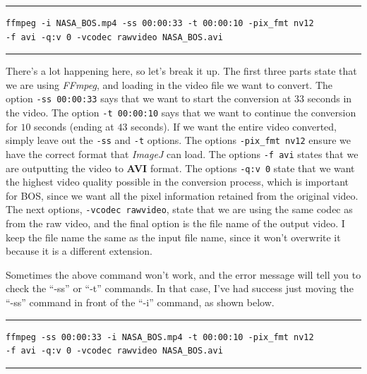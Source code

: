 \documentclass[letterpaper,12pt]{article}
\begin{document}
\par\noindent\rule{\textwidth}{0.4pt}

\vspace{1em}
\lstset{basicstyle=\large}
\begin{lstlisting}[style=CMD]
ffmpeg -i NASA_BOS.mp4 -ss 00:00:33 -t 00:00:10 -pix_fmt nv12 
-f avi -q:v 0 -vcodec rawvideo NASA_BOS.avi
\end{lstlisting}

\par\noindent\rule{\textwidth}{0.4pt}

There's a lot happening here, so let's break it up.  The first three parts state that we are using \textit{FFmpeg}, and loading in the video file we want to convert.  The option \texttt{-ss 00:00:33} says that we want to start the conversion at $33$ seconds in the video.  The option \texttt{-t 00:00:10} says that we want to continue the conversion for $10$ seconds (ending at $43$ seconds).  If we want the entire video converted, simply leave out the \texttt{-ss} and \texttt{-t} options.  The options \texttt{-pix\_fmt nv12} ensure we have the correct format that \textit{ImageJ} can load.  The options \texttt{-f avi} states that we are outputting the video to \textbf{AVI} format.  The options \texttt{-q:v 0} state that we want the highest video quality possible in the conversion process, which is important for BOS, since we want all the pixel information retained from the original video.  The next options, \texttt{-vcodec rawvideo}, state that we are using the same codec as from the raw video, and the final option is the file name of the output video.  I keep the file name the same as the input file name, since it won't overwrite it because it is a different extension.

Sometimes the above command won't work, and the error message will tell you to check the ``-ss'' or ``-t'' commands.  In that case, I've had success just moving the ``-ss'' command in front of the ``-i'' command, as shown below.

\par\noindent\rule{\textwidth}{0.4pt}

\vspace{1em}
\lstset{basicstyle=\large}
\begin{lstlisting}[style=CMD]
ffmpeg -ss 00:00:33 -i NASA_BOS.mp4 -t 00:00:10 -pix_fmt nv12 
-f avi -q:v 0 -vcodec rawvideo NASA_BOS.avi
\end{lstlisting}

\par\noindent\rule{\textwidth}{0.4pt}
\end{document}
